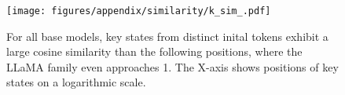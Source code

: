 \begin{figure}[ht]
    \centering
    \texttt{[image: figures/appendix/similarity/k\_sim\_.pdf]}
    \caption{For all base models, key states from distinct inital tokens exhibit a large cosine similarity than the following positions, where the LLaMA family even approaches 1. The X-axis shows positions of key states on a logarithmic scale.} 
    \label{fig:app:sim:k}
\end{figure}